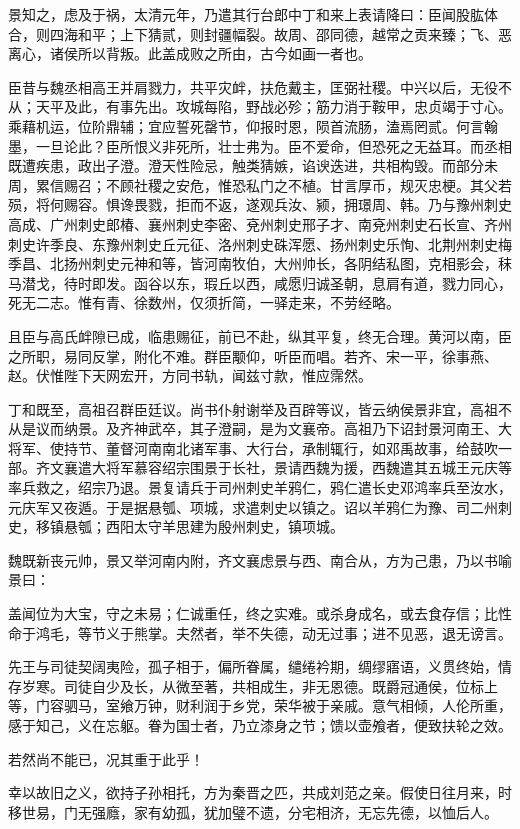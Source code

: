 \documentclass[12pt,UTF8]{ctexbook}
\begin{document}
景知之，虑及于祸，太清元年，乃遣其行台郎中丁和来上表请降曰：臣闻股肱体合，则四海和平；上下猜贰，则封疆幅裂。故周、邵同德，越常之贡来臻；飞、恶离心，诸侯所以背叛。此盖成败之所由，古今如画一者也。

臣昔与魏丞相高王并肩戮力，共平灾衅，扶危戴主，匡弼社稷。中兴以后，无役不从；天平及此，有事先出。攻城每陷，野战必殄；筋力消于鞍甲，忠贞竭于寸心。乘藉机运，位阶鼎辅；宜应誓死罄节，仰报时恩，陨首流肠，溘焉罔贰。何言翰墨，一旦论此？臣所恨义非死所，壮士弗为。臣不爱命，但恐死之无益耳。而丞相既遭疾患，政出子澄。澄天性险忌，触类猜嫉，谄谀迭进，共相构毁。而部分未周，累信赐召；不顾社稷之安危，惟恐私门之不植。甘言厚币，规灭忠梗。其父若殒，将何赐容。惧谗畏戮，拒而不返，遂观兵汝、颍，拥璟周、韩。乃与豫州刺史高成、广州刺史郎椿、襄州刺史李密、兗州刺史邢子才、南兗州刺史石长宣、齐州刺史许季良、东豫州刺史丘元征、洛州刺史硃浑愿、扬州刺史乐恂、北荆州刺史梅季昌、北扬州刺史元神和等，皆河南牧伯，大州帅长，各阴结私图，克相影会，秣马潜戈，待时即发。函谷以东，瑕丘以西，咸愿归诚圣朝，息肩有道，戮力同心，死无二志。惟有青、徐数州，仅须折简，一驿走来，不劳经略。

且臣与高氏衅隙已成，临患赐征，前已不赴，纵其平复，终无合理。黄河以南，臣之所职，易同反掌，附化不难。群臣颙仰，听臣而唱。若齐、宋一平，徐事燕、赵。伏惟陛下天网宏开，方同书轨，闻兹寸款，惟应霈然。

丁和既至，高祖召群臣廷议。尚书仆射谢举及百辟等议，皆云纳侯景非宜，高祖不从是议而纳景。及齐神武卒，其子澄嗣，是为文襄帝。高祖乃下诏封景河南王、大将军、使持节、董督河南南北诸军事、大行台，承制辄行，如邓禹故事，给鼓吹一部。齐文襄遣大将军慕容绍宗围景于长社，景请西魏为援，西魏遣其五城王元庆等率兵救之，绍宗乃退。景复请兵于司州刺史羊鸦仁，鸦仁遣长史邓鸿率兵至汝水，元庆军又夜遁。于是据悬瓠、项城，求遣刺史以镇之。诏以羊鸦仁为豫、司二州刺史，移镇悬瓠；西阳太守羊思建为殷州刺史，镇项城。

魏既新丧元帅，景又举河南内附，齐文襄虑景与西、南合从，方为己患，乃以书喻景曰：

盖闻位为大宝，守之未易；仁诚重任，终之实难。或杀身成名，或去食存信；比性命于鸿毛，等节义于熊掌。夫然者，举不失德，动无过事；进不见恶，退无谤言。

先王与司徒契阔夷险，孤子相于，偏所眷属，缱绻衿期，绸缪寤语，义贯终始，情存岁寒。司徒自少及长，从微至著，共相成生，非无恩德。既爵冠通侯，位标上等，门容驷马，室飨万钟，财利润于乡党，荣华被于亲戚。意气相倾，人伦所重，感于知己，义在忘躯。眷为国士者，乃立漆身之节；馈以壶飧者，便致扶轮之效。

若然尚不能已，况其重于此乎！

幸以故旧之义，欲持子孙相托，方为秦晋之匹，共成刘范之亲。假使日往月来，时移世易，门无强廕，家有幼孤，犹加璧不遗，分宅相济，无忘先德，以恤后人。
\end{document}
